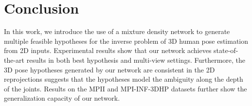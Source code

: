 \documentclass[10pt,twocolumn,letterpaper]{article}
\begin{document}
\section{Conclusion}

In this work, we introduce the use of a mixture density network to generate multiple feasible hypotheses for the inverse problem of 3D human pose estimation from 2D inputs. Experimental results show that our network achieves state-of-the-art results in both best hypothesis and multi-view settings. Furthermore, the 3D pose hypotheses generated by our network are consistent in the 2D reprojections suggests that the hypotheses model the ambiguity along the depth of the joints.
Results on the MPII and MPI-INF-3DHP datasets further show the generalization capacity of our network.

{\small
  
  
}
\end{document}
